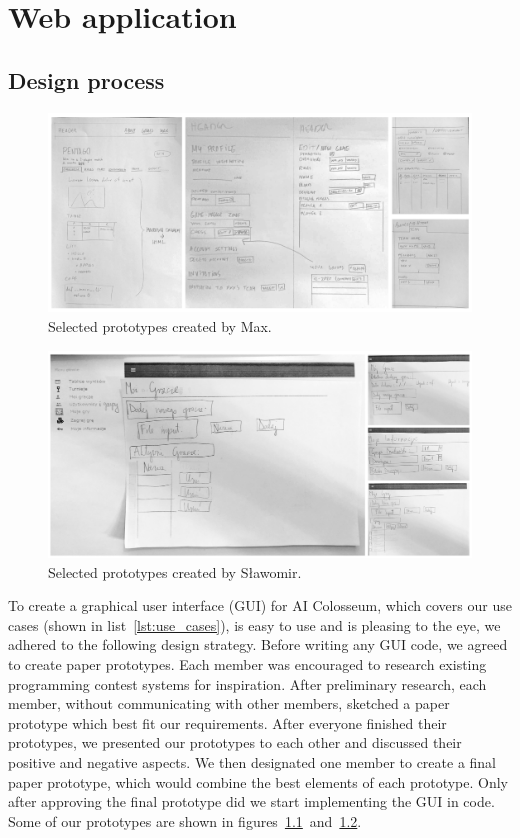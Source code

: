 \chapter{Web application} %
\label{chap:webapp}

\section{Design process}

\begin{figure}[t]
    \centering\includegraphics[width=\textwidth]{figures/proto_max.jpg}
    \caption{Selected prototypes created by Max.}\label{fig:proto1}
\end{figure}

\begin{figure}[t]
    \centering\includegraphics[width=\textwidth]{figures/proto_slawek.jpg}
	\caption{Selected prototypes created by Sławomir.}\label{fig:proto2}
\end{figure}

To create a graphical user interface (GUI) for AI Colosseum, which covers our use cases (shown in list~\ref{lst:use_cases}), is easy to use and is pleasing to the eye, we adhered to the following design strategy. Before writing any GUI code, we agreed to create paper prototypes. Each member was encouraged to research existing programming contest systems for inspiration. After preliminary research, each member, without communicating with other members, sketched a paper prototype which best fit our requirements. After everyone finished their prototypes, we presented our prototypes to each other and discussed their positive and negative aspects. We then designated one member to create a final paper prototype, which would combine the best elements of each prototype. Only after approving the final prototype did we start implementing the GUI in code. Some of our prototypes are shown in figures~\ref{fig:proto1}~and~\ref{fig:proto2}.

